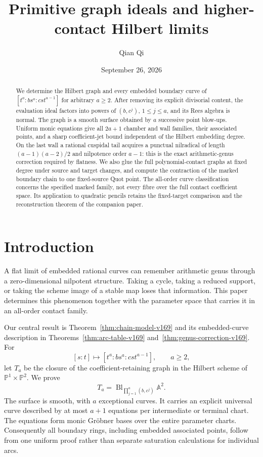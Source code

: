 \documentclass[11pt,reqno]{amsart}
\numberwithin{equation}{section}
\theoremstyle{definition}\newtheorem{definition}[theorem]{Definition}
\theoremstyle{remark}\newtheorem{remark}[theorem]{Remark}
\newcommand{\Pj}{\mathbb P}\newcommand{\A}{\mathbb A}
\begin{document}
\title{Primitive graph ideals and higher-contact Hilbert limits}
\author{Qian Qi}
\date{September 26, 2026}
\begin{abstract}
We determine the Hilbert graph and every embedded boundary curve of
$[t^a:bs^a:cst^{a-1}]$ for arbitrary $a\geq2$. After removing its
explicit divisorial content, the evaluation ideal factors into powers
of $(b,c^j)$, $1\leq j\leq a$, and its Rees algebra is normal. The
graph is a smooth surface obtained by $a$ successive point blow-ups.
Uniform monic equations give all $2a+1$ chamber and wall families,
their associated points, and a sharp coefficient-jet bound independent
of the Hilbert embedding degree. On the last wall a rational cuspidal
tail acquires a punctual nilradical of length $(a-1)(a-2)/2$ and
nilpotence order $a-1$: this is the exact arithmetic-genus correction
required by flatness. We also glue the full polynomial-contact graphs
at fixed degree under source and target changes, and compute the
contraction of the marked boundary chain to one fixed-source Quot
point. The all-order curve classification concerns the specified
marked family, not every fibre over the full contact coefficient
space. Its application to quadratic pencils retains the fixed-target
comparison and the reconstruction theorem of the companion paper.
\end{abstract}
\maketitle


\section{Introduction}
\label{sec:paper-ii-v164}\label{sec:paper-ii-v166}\label{sec:paper-ii-v167}
\label{sec:paper-ii-v169}
A flat limit of embedded rational curves can remember arithmetic genus
through a zero-dimensional nilpotent structure. Taking a cycle, taking
a reduced support, or taking the scheme image of a stable map loses
that information. This paper determines this phenomenon together with
the parameter space that carries it in an all-order contact family.

Our central result is Theorem~\ref{thm:chain-model-v169} and its
embedded-curve description in Theorems~\ref{thm:arc-table-v169}
and~\ref{thm:genus-correction-v169}. For
\[
 [s:t]\longmapsto[t^a:bs^a:cst^{a-1}],\qquad a\geq2,
\]
let $T_a$ be the closure of the coefficient-retaining graph in the
Hilbert scheme of $\Pj^1\times\Pj^2$. We prove
\[
 T_a=\operatorname{Bl}_{\prod_{j=1}^a(b,c^j)}\A^2.
\]
The surface is smooth, with $a$ exceptional curves. It carries an
explicit universal curve described by at most $a+1$ equations per
intermediate or terminal chart. The equations form monic Gr\"obner
bases over the entire parameter charts. Consequently all boundary
rings, including embedded associated points, follow from one uniform
proof rather than separate saturation calculations for individual
arcs.
\end{document}
